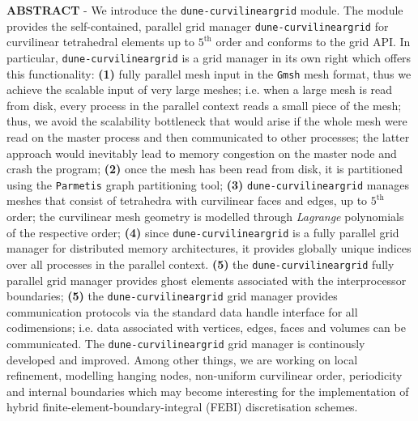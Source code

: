 \documentclass[12pt]{article}
\begin{document}
\begin{titlepage}
\noindent \textbf{\textsc{ABSTRACT}} - We introduce the \texttt{dune-curvilineargrid} module. The module provides the self-contained, parallel
grid manager \texttt{dune-curvilineargrid} for curvilinear tetrahedral elements up to $5^{\mathrm{th}}$  order and conforms to the  grid API.
In particular, \texttt{dune-curvilineargrid} is a grid manager in its own right which offers this functionality:
\textbf{(1)} fully parallel mesh input in the \texttt{Gmsh} mesh format, thus we achieve the scalable input of very large meshes;
i.e. when a large mesh is read from disk, every process in the parallel context reads a small piece of the mesh; thus, we avoid the
scalability bottleneck that would arise if the whole mesh were read on the master process and then communicated to other processes;
the latter approach would inevitably lead to memory congestion on the master node and crash the program;
\textbf{(2)} once the mesh has been read from disk, it is partitioned using the \texttt{Parmetis} graph partitioning tool;
\textbf{(3)} \texttt{dune-curvilineargrid} manages meshes that consist of tetrahedra with curvilinear faces and edges, up to
$5^{\mathrm{th}}$ order; the curvilinear mesh geometry is modelled through \textit{Lagrange} polynomials of the respective order;
\textbf{(4)} since \texttt{dune-curvilineargrid} is a fully parallel grid manager for distributed memory architectures, it provides
globally unique indices over all processes in the parallel context.
\textbf{(5)} the \texttt{dune-curvilineargrid} fully parallel grid manager provides ghost elements associated with the interprocessor
boundaries;
\textbf{(5)} the \texttt{dune-curvilineargrid} grid manager provides communication protocols via the standard
 data handle interface for all codimensions; i.e. data associated with vertices, edges, faces and volumes can
be communicated.
The \texttt{dune-curvilineargrid} grid manager is continously developed and improved. Among other things, we are working
on local refinement, modelling hanging nodes, non-uniform curvilinear order, periodicity and internal boundaries which
may become interesting for the implementation of hybrid finite-element-boundary-integral (FEBI) discretisation schemes.










\end{titlepage}
\end{document}
